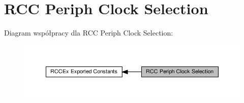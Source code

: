 \hypertarget{group___r_c_c_ex___periph___clock___selection}{}\section{R\+CC Periph Clock Selection}
\label{group___r_c_c_ex___periph___clock___selection}
Diagram współpracy dla R\+CC Periph Clock Selection\+:\nopagebreak
\begin{figure}[H]
\begin{center}
\leavevmode
\includegraphics[width=350pt]{group___r_c_c_ex___periph___clock___selection}
\end{center}
\end{figure}
